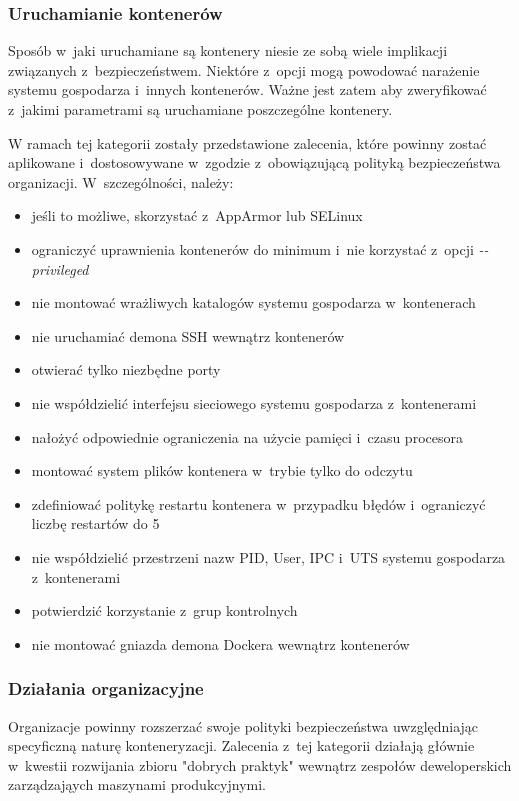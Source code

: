 \subsubsection{Uruchamianie kontenerów}

Sposób w~jaki uruchamiane są kontenery niesie ze sobą wiele implikacji związanych z~bezpieczeństwem. Niektóre z~opcji mogą powodować narażenie systemu gospodarza i~innych kontenerów. Ważne jest zatem aby zweryfikować z~jakimi parametrami są uruchamiane poszczególne kontenery.

W ramach tej kategorii zostały przedstawione zalecenia, które powinny zostać aplikowane i~dostosowywane w~zgodzie z~obowiązującą polityką bezpieczeństwa organizacji. W~szczególności, należy:

\begin{itemize}
    \item jeśli to możliwe, skorzystać z~AppArmor lub SELinux
    \item ograniczyć uprawnienia kontenerów do minimum i~nie korzystać z~opcji \textit{-{}-privileged}
    \item nie montować wrażliwych katalogów systemu gospodarza w~kontenerach
    \item nie uruchamiać demona SSH wewnątrz kontenerów
    \item otwierać tylko niezbędne porty
    \item nie współdzielić interfejsu sieciowego systemu gospodarza z~kontenerami
    \item nałożyć odpowiednie ograniczenia na użycie pamięci i~czasu procesora
    \item montować system plików kontenera w~trybie tylko do odczytu
    \item zdefiniować politykę restartu kontenera w~przypadku błędów i~ograniczyć liczbę restartów do 5
    \item nie współdzielić przestrzeni nazw PID, User, IPC i~UTS systemu gospodarza z~kontenerami
    \item potwierdzić korzystanie z~grup kontrolnych
    \item nie montować gniazda demona Dockera wewnątrz kontenerów
\end{itemize}

\subsubsection{Działania organizacyjne}

Organizacje powinny rozszerzać swoje polityki bezpieczeństwa uwzględniając specyficzną naturę konteneryzacji. Zalecenia z~tej kategorii działają głównie w~kwestii rozwijania zbioru "dobrych praktyk" wewnątrz zespołów deweloperskich zarządzająych maszynami produkcyjnymi.

